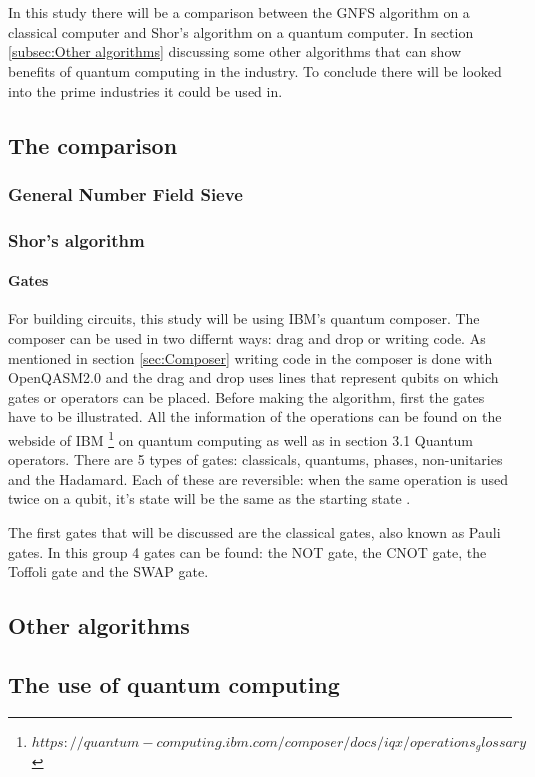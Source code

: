 
\chapter{}
\label{ch:onderzoek}



In this study there will be a comparison between the GNFS algorithm on a classical computer and Shor's algorithm on a quantum computer.
In section \ref{subsec:Other algorithms} discussing some other algorithms that can show benefits of quantum computing in the industry. To conclude there will be looked into the prime industries it could be used in.

\section{The comparison}
\subsection{General Number Field Sieve}
\subsection{Shor's algorithm}
\subsubsection{Gates}
\label{gates}
For building circuits, this study will be using IBM's quantum composer. The composer can be used in two differnt ways: drag and drop or writing code.
As mentioned in section \ref{sec:Composer} writing code in the composer is done with OpenQASM2.0 and the drag and drop uses lines that represent qubits on which gates or operators can be placed.
Before making the algorithm, first the gates have to be illustrated. All the information of the operations can be found on the webside of IBM \footnote{$https://quantum-computing.ibm.com/composer/docs/iqx/operations_glossary$} on quantum computing as well as in \textcite{Hidary_2019} section 3.1 Quantum operators.
There are 5 types of gates: classicals, quantums, phases, non-unitaries and the Hadamard. Each of these are reversible: when the same operation is used twice on a qubit, it's state will be the same as the starting state \autocite{reversible_gates, revgates}.

The first gates that will be discussed are the classical gates, also known as Pauli gates. In this group 4 gates can be found: the NOT gate, the CNOT gate, the Toffoli gate and the SWAP gate.
\section{Other algorithms}
\label{Other algorithms}
\section{The use of quantum computing}
